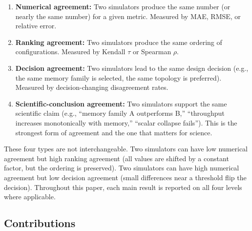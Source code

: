 \documentclass[aps,prapplied,reprint,superscriptaddress]{revtex4-2}
\begin{document}
\begin{enumerate}[leftmargin=2em]
\item \textbf{Numerical agreement:} Two simulators produce the same number (or nearly the same number) for a given metric. Measured by MAE, RMSE, or relative error.
\item \textbf{Ranking agreement:} Two simulators produce the same ordering of configurations. Measured by Kendall $\tau$ or Spearman $\rho$.
\item \textbf{Decision agreement:} Two simulators lead to the same design decision (e.g., the same memory family is selected, the same topology is preferred). Measured by decision-changing disagreement rates.
\item \textbf{Scientific-conclusion agreement:} Two simulators support the same scientific claim (e.g., ``memory family A outperforms B,'' ``throughput increases monotonically with memory,'' ``scalar collapse fails''). This is the strongest form of agreement and the one that matters for science.
\end{enumerate}

These four types are not interchangeable. Two simulators can have low numerical agreement but high ranking agreement (all values are shifted by a constant factor, but the ordering is preserved). Two simulators can have high numerical agreement but low decision agreement (small differences near a threshold flip the decision). Throughout this paper, each main result is reported on all four levels where applicable.

\subsection{Contributions}
\end{document}
